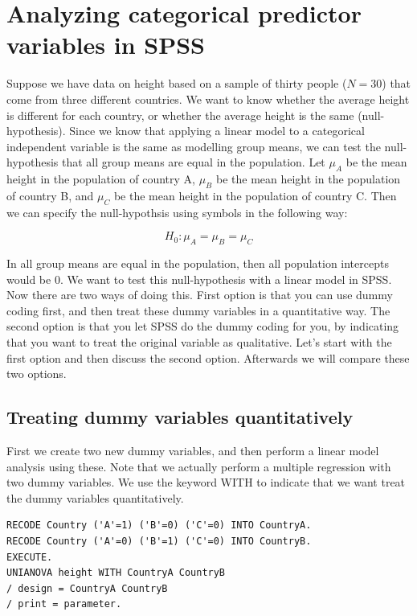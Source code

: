 \documentclass[]{report}\usepackage[]{graphicx}\usepackage[]{color}
\begin{document}
\section{Analyzing categorical predictor variables in SPSS}

Suppose we have data on height based on a sample of thirty people ($N=30$) that come from three different countries. We want to know whether the average height is different for each country, or whether the average height is the same (null-hypothesis). Since we know that applying a linear model to a categorical independent variable is the same as modelling group means, we can test the null-hypothesis that all group means are equal in the population. Let $\mu_A$ be the mean height in the population of country A, $\mu_B$ be the mean height in the population of country B, and $\mu_C$ be the mean height in the population of country C. Then we can specify the null-hypothsis using symbols in the following way:

\begin{equation}
H_0: \mu_A= \mu_B=\mu_C
\end{equation}

In all group means are equal in the population, then all population intercepts would be 0. We want to test this null-hypothesis with a linear model in SPSS. Now there are two ways of doing this. First option is that you can use dummy coding first, and then treat these dummy variables in a quantitative way. The second option is that you let SPSS do the dummy coding for you, by indicating that you want to treat the original variable as qualitative. Let's start with the first option and then discuss the second option. Afterwards we will compare these two options.

\subsection{Treating dummy variables quantitatively}


First we create two new dummy variables, and then perform a linear model analysis using these. Note that we actually perform a multiple regression with two dummy variables. We use the keyword WITH to indicate that we want treat the dummy variables quantitatively.


\begin{verbatim}
RECODE Country ('A'=1) ('B'=0) ('C'=0) INTO CountryA.
RECODE Country ('A'=0) ('B'=1) ('C'=0) INTO CountryB.
EXECUTE.
UNIANOVA height WITH CountryA CountryB
/ design = CountryA CountryB
/ print = parameter.
\end{verbatim}
\end{document}
